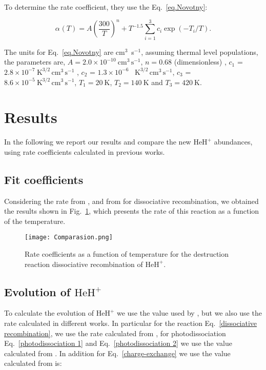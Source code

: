 \documentclass[baaa]{baaa}
\begin{document}
To determine the rate coefficient, they use the Eq.~\ref{eq.Novotny}:

 \begin{equation}\label{eq.Novotny}
         \alpha_{}(T)= A \left(\frac{300}{T}\right)^n + T^{-1.5} \sum_{i=1}^3 c_i \exp(-T_i/T).
     \end{equation} 

The units for Eq.~\ref{eq.Novotny} are cm$^3$~s$^{-1}$, assuming thermal level populations, the parameters are, $A =2.0 \times 10^{-10}~\mathrm{cm^3 \, s^{-1}}$, $n=0.68$ (dimensionless) ,  $c_1$ =$2.8 \times 10^{-7}~\mathrm{K^{3/2} \, cm^3\, s^{-1}}$ , $c_2$ = $1.3 \times 10^{-6}$~ $\mathrm{K^{3/2} \, cm^3\, s^{-1}}$, $c_3$ = $8.6 \times 10^{-5}~\mathrm{K^{3/2} \, cm^3\, s^{-1}}$, $T_1 = 20 ~\mathrm{K}$, $T_2 = 140~\mathrm{K}$ and $T_3 = 420~\mathrm{K}$. 


\section{Results}

 In the following we report our results and compare the new $\mathrm{HeH^+}$ abundances, using rate coefficients calculated in previous works.
 

\subsection{Fit coefficients}

Considering the rate from \citet{GP98}, \citet{Stancil1998} and from \citet{Novotny2019} for dissociative recombination, we obtained the results shown in Fig.~\ref{Comparasion}, which presents the rate of this reaction as a function of the temperature. 
\begin{figure}[h!]
  \centering
   \texttt{[image: Comparasion.png]}
\caption{Rate coefficients as a function of temperature for the destruction reaction dissociative recombination of $\mathrm{HeH^+}$.}
    \label{Comparasion}
\end{figure}

\subsection{Evolution of $\mathrm{HeH^+}$}

To calculate the evolution of $\mathrm{HeH^+}$ we use the value used by \citet{Schleicher2008}, but we also use the rate calculated in different works. In particular for the reaction Eq.~\ref{dissociative recombination}, we use the rate calculated from \citet{Novotny2019}, for photodissociation Eq.~\ref{photodissociation 1} and  Eq.~\ref{photodissociation 2} we use the value calculated from \citet{Coppola2017}. In addition for Eq.~\ref{charge-exchange} we use the value calculated from \citet{Bovino2011} is:  
\end{document}
